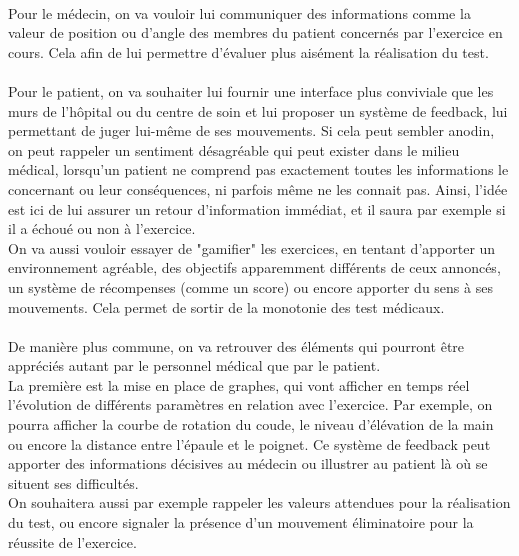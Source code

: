 \documentclass[french,12pt]{report}
\begin{document}
\paragraph{}
Pour le médecin, on va vouloir lui communiquer des informations comme la valeur de position ou d'angle des membres du
patient concernés par l'exercice en cours. Cela afin de lui permettre d'évaluer plus aisément la réalisation du test. 

\paragraph{}
Pour le patient, on va souhaiter lui fournir une interface plus conviviale que les murs de l'hôpital ou du centre de soin et lui
proposer un système de feedback, lui permettant de juger lui-même de ses mouvements. Si cela peut sembler anodin, on
peut rappeler un sentiment désagréable qui peut exister dans le milieu médical, lorsqu'un patient ne comprend pas exactement
toutes les informations le concernant ou leur conséquences, ni parfois même ne les connait pas. Ainsi, l'idée est ici de lui
assurer un retour d'information immédiat, et il saura par exemple si il a échoué ou non à l'exercice.\\
On va aussi vouloir essayer de "gamifier" les exercices, en tentant d'apporter un environnement agréable, des objectifs
apparemment différents de ceux annoncés, un système de récompenses (comme un score) ou encore apporter du sens
à ses mouvements. Cela permet de sortir de la monotonie des test médicaux.

\paragraph{}
De manière plus commune, on va retrouver des éléments qui pourront être appréciés autant par le personnel médical que par 
le patient. \\
La première est la mise en place de graphes, qui vont afficher en temps réel l'évolution de différents paramètres en relation
avec l'exercice. Par exemple, on pourra afficher la courbe de rotation du coude, le niveau d'élévation de la main ou encore la
distance entre l'épaule et le poignet. Ce système de feedback peut apporter des informations décisives au médecin ou
illustrer au patient là où se situent ses difficultés.\\
On souhaitera aussi par exemple rappeler les valeurs attendues pour la réalisation du test, ou encore signaler la présence
d'un mouvement éliminatoire pour la réussite de l'exercice.
\end{document}
